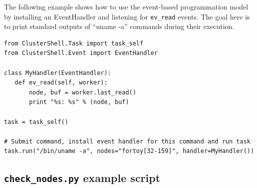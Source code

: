\documentclass[english,a4paper]{csuserguide}
\begin{document}
The following example shows how to use the event-based programmation model by installing an EventHandler and listening for \lstinline+ev_read+ events. The goal here is to print standard outputs of ``uname -a'' commands during their execution.
\medskip
\begin{lstlisting}[breaklines=true, breakatwhitespace=true]
from ClusterShell.Task import task_self
from ClusterShell.Event import EventHandler

class MyHandler(EventHandler):
   def ev_read(self, worker):
       node, buf = worker.last_read()
       print "%s: %s" % (node, buf)

task = task_self()

# Submit command, install event handler for this command and run task
task.run("/bin/uname -a", nodes="fortoy[32-159]", handler=MyHandler())
\end{lstlisting}


\subsection{\texttt{check\_nodes.py} example script}
\end{document}
